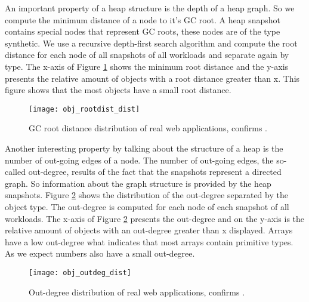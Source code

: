 An important property of a heap structure is the depth of a heap graph. So we compute the minimum distance of a node to it's GC root. A heap snapshot contains special nodes that represent GC roots, these nodes are of the type synthetic. We use a recursive depth-first search algorithm and compute the root distance for each node of all snapshots of all workloads and separate again by type. The x-axis of Figure \ref{fig:obj_rootdist_dist} shows the minimum root distance and the y-axis presents the relative amount of objects with a root distance greater than x. This figure shows that the most objects have a small root distance.
\begin{figure}
	\centering
	\texttt{[image: obj\_rootdist\_dist]}
	\caption{GC root distance distribution of real web applications, confirms \cite{JSMeter2009}.}
	\label{fig:obj_rootdist_dist}
\end{figure}

Another interesting property by talking about the structure of a heap is the number of out-going edges of a node. The number of out-going edges, the so-called out-degree, results of the fact that the snapshots represent a directed graph. So information about the graph structure is provided by the heap snapshots. Figure \ref{fig:obj_outdeg_dist} shows the distribution of the out-degree separated by the object type. The out-degree is computed for each node of each snapshot of all workloads. The x-axis of Figure \ref{fig:obj_outdeg_dist} presents the out-degree and on the y-axis is the relative amount of objects with an out-degree greater than x displayed. Arrays have a low out-degree what indicates that most arrays contain primitive types. As we expect numbers also have a small out-degree.
\begin{figure}
	\centering
	\texttt{[image: obj\_outdeg\_dist]}
	\caption{Out-degree distribution of real web applications, confirms \cite{JSMeter2009}.}
	\label{fig:obj_outdeg_dist}
\end{figure}

